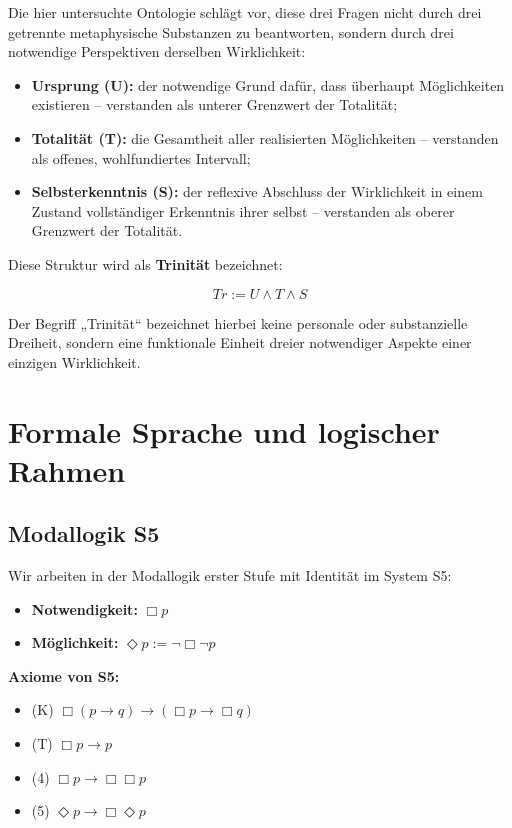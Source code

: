 \documentclass[
]{article}
\begin{document}
Die hier untersuchte Ontologie schlägt vor, diese drei Fragen nicht durch drei getrennte metaphysische Substanzen zu beantworten, sondern durch drei notwendige Perspektiven derselben Wirklichkeit:

\begin{itemize}
\item \textbf{Ursprung (U):} der notwendige Grund dafür, dass überhaupt Möglichkeiten existieren – verstanden als unterer Grenzwert der Totalität;
\item \textbf{Totalität (T):} die Gesamtheit aller realisierten Möglichkeiten – verstanden als offenes, wohlfundiertes Intervall;
\item \textbf{Selbsterkenntnis (S):} der reflexive Abschluss der Wirklichkeit in einem Zustand vollständiger Erkenntnis ihrer selbst – verstanden als oberer Grenzwert der Totalität.
\end{itemize}

Diese Struktur wird als \textbf{Trinität} bezeichnet:

\[
Tr := U \land T \land S
\]

Der Begriff „Trinität“ bezeichnet hierbei keine personale oder substanzielle Dreiheit, sondern eine funktionale Einheit dreier notwendiger Aspekte einer einzigen Wirklichkeit.

\section{Formale Sprache und logischer Rahmen}\label{formale-sprache-und-logischer-rahmen}

\subsection{Modallogik S5}\label{modallogik-s5}

Wir arbeiten in der Modallogik erster Stufe mit Identität im System S5:

\begin{itemize}
\item \textbf{Notwendigkeit:} \(\Box p\)
\item \textbf{Möglichkeit:} \(\Diamond p := \neg\Box\neg p\)
\end{itemize}

\textbf{Axiome von S5:}
\begin{itemize}
\item (K) \(\Box(p \rightarrow q) \rightarrow (\Box p \rightarrow \Box q)\)
\item (T) \(\Box p \rightarrow p\)
\item (4) \(\Box p \rightarrow \Box\Box p\)
\item (5) \(\Diamond p \rightarrow \Box\Diamond p\)
\end{itemize}
\end{document}
